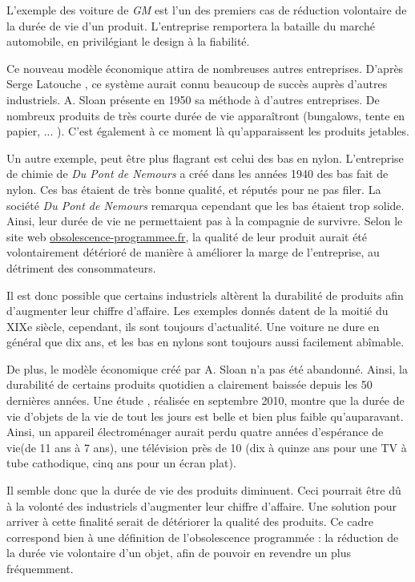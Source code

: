 \smallbreak

L'exemple des voiture de \textit{GM} est l'un des premiers cas de réduction volontaire de la durée de vie d'un produit. L'entreprise remportera la bataille du marché automobile, en privilégiant le design à la fiabilité.

Ce nouveau modèle économique attira de nombreuses autres entreprises. D'après Serge Latouche \cite{bpc}, ce système aurait connu beaucoup de succès auprès d'autres industriels. A. Sloan présente en 1950 sa méthode à d'autres entreprises. De nombreux produits de très courte durée de vie apparaîtront (bungalows, tente en papier, ... ). C'est également à ce moment là qu'apparaissent les produits jetables.
 
 
 \smallbreak
Un autre exemple, peut être plus flagrant est celui des bas en nylon.
L'entreprise de chimie de \textit{Du Pont de Nemours} a créé dans les années 1940 des bas fait de nylon.
Ces bas étaient de très bonne qualité, et réputés pour ne pas filer. La société \textit{Du Pont de Nemours} remarqua cependant que les bas étaient trop solide. 
Ainsi, leur durée de vie ne permettaient pas à la compagnie de survivre.
Selon le site web \url{obsolescence-programmee.fr},  la qualité de leur produit aurait été volontairement détérioré de manière à améliorer la marge de l'entreprise, au détriment des consommateurs. 

\medbreak

Il est donc possible que certains industriels altèrent la durabilité de produits afin d'augmenter leur chiffre d'affaire. Les exemples donnés datent de la moitié du XIXe siècle, cependant, ils sont toujours d'actualité. Une voiture ne dure en général que dix ans, et les bas en nylons sont toujours aussi facilement abîmable. 

De plus, le modèle économique créé par A. Sloan n'a pas été abandonné. Ainsi, la durabilité de certains produits quotidien a clairement baissée depuis les 50 dernières années. 
Une étude \cite{opSsg}, réalisée en septembre 2010, montre que la durée de vie d'objets de la vie de tout les jours est belle et bien plus faible qu'auparavant.
Ainsi, un appareil électroménager aurait perdu quatre années d'espérance de vie(de 11 ans à 7 ans), une télévision près de 10 (dix à quinze ans pour une TV à tube cathodique, cinq ans pour un écran plat). 

\medbreak

Il semble donc que la durée de vie des produits diminuent. Ceci pourrait être dû à la volonté des industriels d'augmenter leur chiffre d'affaire. Une solution pour arriver à cette finalité serait de détériorer la qualité des produits. Ce cadre correspond  bien à une définition de l'obsolescence programmée : la réduction de la durée vie volontaire d'un objet, afin de pouvoir en revendre un plus fréquemment. 
